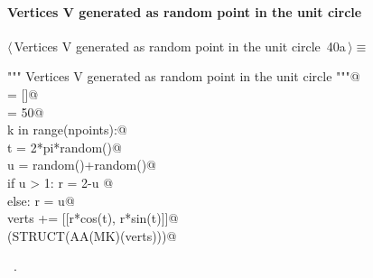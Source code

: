 \documentclass[11pt,oneside]{article}    %
\begin{document}
\paragraph{Vertices V generated as random point in the unit circle}
\begin{flushleft} \small \label{scrap61}
\protect{}$\langle\,$Vertices V generated as random point in the unit circle\nobreak\ {\footnotesize 40a}$\,\rangle\equiv$
\vspace{-1ex}
\begin{list}{}{} \item
\mbox{}\verb@""" Vertices V generated as random point in the unit circle """@\\
\mbox{}\verb@verts = []@\\
\mbox{}\verb@npoints = 50@\\
\mbox{}\verb@for k in range(npoints):@\\
\mbox{}\verb@    t = 2*pi*random()@\\
\mbox{}\verb@    u = random()+random()@\\
\mbox{}\verb@    if u > 1: r = 2-u @\\
\mbox{}\verb@    else: r = u@\\
\mbox{}\verb@    verts += [[r*cos(t), r*sin(t)]]@\\
\mbox{}\verb@VIEW(STRUCT(AA(MK)(verts)))@\\
\mbox{}\verb@@{\NWsep}
\end{list}
\vspace{-1ex}
\footnotesize\addtolength{\baselineskip}{-1ex}
\begin{list}{}{\setlength{\itemsep}{-\parsep}\setlength{\itemindent}{-\leftmargin}}
\item \NWtxtMacroRefIn\ .
\end{list}
\end{flushleft}
\end{document}
